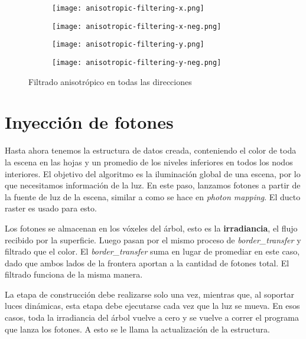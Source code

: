 \begin{figure}
    \begin{center}
        \begin{subfigure}{.24\textwidth}
            \texttt{[image: anisotropic-filtering-x.png]}
        \end{subfigure}
        \begin{subfigure}{.24\textwidth}
            \texttt{[image: anisotropic-filtering-x-neg.png]}
        \end{subfigure}
        \begin{subfigure}{.24\textwidth}
            \texttt{[image: anisotropic-filtering-y.png]}
        \end{subfigure}
        \begin{subfigure}{.24\textwidth}
            \texttt{[image: anisotropic-filtering-y-neg.png]}
        \end{subfigure}
    \end{center}
    \caption{Filtrado anisotrópico en todas las direcciones}
    \label{fig:svo_filtering_anisotropic}
\end{figure}

\section{Inyección de fotones}\label{sec:photon-injection}

Hasta ahora tenemos la estructura de datos creada, conteniendo el color de toda la escena en las hojas y un promedio de los niveles inferiores en todos los nodos interiores.
El objetivo del algoritmo es la iluminación global de una escena, por lo que necesitamos información de la luz.
En este paso, lanzamos fotones a partir de la fuente de luz de la escena, similar a como se hace en \textit{photon mapping}.
El ducto raster es usado para esto.

Los fotones se almacenan en los vóxeles del árbol, esto es la \textbf{irradiancia}, el flujo recibido por la superficie.
Luego pasan por el mismo proceso de \textit{border\_transfer} y filtrado que el color.
El \textit{border\_transfer} suma en lugar de promediar en este caso, dado que ambos lados de la frontera aportan a la cantidad de fotones total.
El filtrado funciona de la misma manera.

La etapa de construcción debe realizarse solo una vez, mientras que, al soportar luces dinámicas, esta etapa debe ejecutarse cada vez que la luz se mueva.
En esos casos, toda la irradiancia del árbol vuelve a cero y se vuelve a correr el programa que lanza los fotones.
A esto se le llama la actualización de la estructura.

